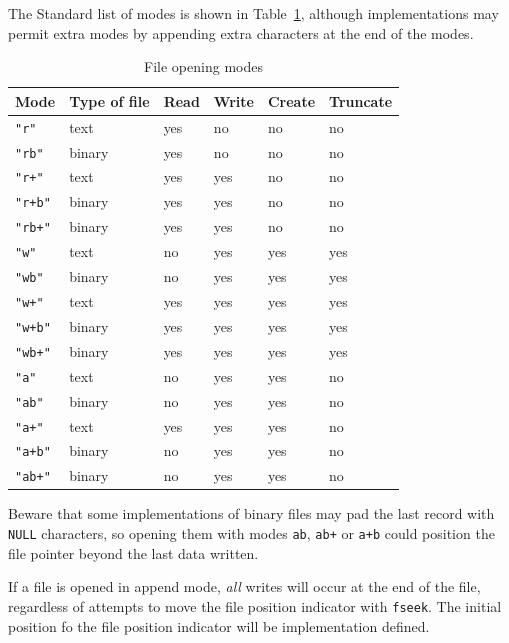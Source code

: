     The Standard list of modes is shown in Table~\ref{tab:fileOpeningModes},
    although
    implementations  may  permit  extra modes by appending extra characters at
    the end of the modes.


    \begin{table}[htb]
      \centering
      \begin{tabular}{llllll}
        \toprule
        Mode           & Type of file & Read & Write & Create & Truncate \\
        \midrule
        \texttt{"r"}   & text   & yes & no  & no  & no  \\
        \texttt{"rb"}  & binary & yes & no  & no  & no  \\
        \texttt{"r+"}  & text   & yes & yes & no  & no  \\
        \texttt{"r+b"} & binary & yes & yes & no  & no  \\
        \texttt{"rb+"} & binary & yes & yes & no  & no  \\
        \texttt{"w"}   & text   & no  & yes & yes & yes \\
        \texttt{"wb"}  & binary & no  & yes & yes & yes \\
        \texttt{"w+"}  & text   & yes & yes & yes & yes \\
        \texttt{"w+b"} & binary & yes & yes & yes & yes \\
        \texttt{"wb+"} & binary & yes & yes & yes & yes \\
        \texttt{"a"}   & text   & no  & yes & yes & no  \\
        \texttt{"ab"}  & binary & no  & yes & yes & no  \\
        \texttt{"a+"}  & text   & yes & yes & yes & no  \\
        \texttt{"a+b"} & binary & no  & yes & yes & no  \\
        \texttt{"ab+"} & binary & no  & yes & yes & no  \\
        \bottomrule
      \end{tabular}
      \caption{\label{tab:fileOpeningModes}File opening modes}
    \end{table}


   Beware that some implementations of binary files may pad the last record
    with \texttt{NULL} characters, so opening them with modes
    \texttt{ab}, \texttt{ab+} or \texttt{a+b} could position the
    file  pointer  beyond  the last data written.


   If a file is opened in append mode, \textit{all} writes will occur at the
    end of the file, regardless of attempts to move the file position indicator
    with \texttt{fseek}.  The initial position fo  the file position
    indicator will be implementation defined.


